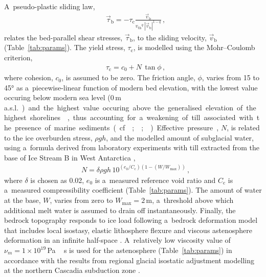 \documentclass[tc, manuscript]{copernicus}
\begin{document}
      A~pseudo-plastic sliding law,
\begin{align}
&\label{eqn:pseudoplastic}
    \vec{\tau}_{\mathrm{b}} = -\tau_{\mathrm{c}} \frac{\vec{v}_{\mathrm{b}}}{{v_{\text{th}}}^q\,|\vec{v}_{\mathrm{b}}|^{1-q}} \,,
\end{align}
      relates the bed-parallel shear stresses, $\vec{\tau}_{\mathrm{b}}$, to
      the sliding velocity, $\vec{v}_{\mathrm{b}}$ (Table~\ref{tab:params}).
      The yield stress, $\tau_{\mathrm{c}}$, is modelled using the
      Mohr--Coulomb criterion,
\begin{align}
&\tau_{\mathrm{c}} = c_0 + N\,\tan{\phi} \,,
\end{align}
      where cohesion, $c_0$, is assumed to be zero. The friction angle,
      $\phi$, varies from 15 to 45\unit{\degree} as a~piecewise-linear
      function of modern bed elevation, with the lowest value occuring below
      modern sea level (0\,\unit{m\,a.s.l.}) and
      the highest value occuring above the generalised elevation of the
      highest shorelines
      \citep[200\,\unit{m\,a.s.l.},][Fig.~5]{Clague.1981}, thus accounting
      for a~weakening of till associated with the presence of marine
      sediments (cf. \citealp{Martin.etal.2011};
      \citealp[Supplement]{Aschwanden.etal.2013};
      \citealp{PISM-authors.2015}). Effective pressure, $N$, is related to
      the ice overburden stress, $\rho gh$, and the modelled amount of
      subglacial water, using a~formula derived from laboratory experiments
      with till extracted from the base of Ice Stream B in West Antarctica
      \citep{Tulaczyk.etal.2000, Bueler.Pelt.2015},
\begin{align}
&N = \delta \rho gh \, 10^{(e_0/C_{\mathrm{c}}) (1 - (W/W_{\text{max}}))} \,,
\end{align}
      where $\delta$ is chosen as 0.02, $e_0$ is a~measured reference void
      ratio and $C_{\mathrm{c}}$ is a~measured compressibility coefficient
      (Table~\ref{tab:params}). The amount of water at the base, $W$, varies
      from zero to $W_{\text{max}}=2$\,\unit{m}, a~threshold above which
      additional melt water is assumed to drain off instantaneously.
      Finally, the bedrock topography responds to ice load following
      a~bedrock deformation model that includes local isostasy, elastic
      lithosphere flexure and viscous astenosphere deformation in an
      infinite half-space \citep{Lingle.Clark.1985,Bueler.etal.2007}.
      A~relatively low viscosity value of $\nu_{m} =
      1\times10^{19}$\,\unit{Pa\,s} is used for the astenosphere
      (Table~\ref{tab:params}) in accordance with the results from regional
      glacial isostatic adjustment modelling at the northern Cascadia
      subduction zone \citep{James.etal.2009}.
\end{document}
